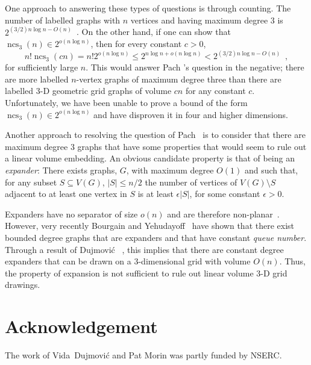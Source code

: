 \documentclass{patmorin}
\DeclareMathOperator{\ncs}{ncs}
\begin{document}
One approach to answering these types of questions is
through counting.  The number of labelled graphs with $n$
vertices and having maximum degree $3$ is $2^{(3/2)n\log n -
O(n)}$~\cite[Appendix~A]{barat.matousek.ea:bounded-degree}. On the other
hand, if one can show that $\ncs_3(n)\in 2^{o(n\log n)}$, then for every
constant $c>0$,
\[
   n!\ncs_3(cn) = n!2^{o(n\log n)} \le 2^{n\log n + o(n\log n)}
   < 2^{(3/2)n\log n - O(n)} \enspace ,
\]
for sufficiently large $n$. This would answer Pach \etal's question in
the negative; there are more labelled $n$-vertex graphs of maximum degree
three than there are labelled 3-D geometric grid graphs of volume $cn$
for any constant $c$.  Unfortunately, we have been unable to prove a
bound of the form $\ncs_3(n)\in 2^{o(n\log n)}$ and have disproven it
in four and higher dimensions.

Another approach to resolving the question of Pach \etal\ is to consider
that there are maximum degree 3 graphs that have some properties that
would seem to rule out a linear volume embedding.  An obvious candidate
property is that of being an \emph{expander}: There exists graphs, $G$,
with maximum degree $O(1)$ and such that, for any subset $S\subseteq
V(G)$, $|S|\le n/2$ the number of vertices of $V(G)\setminus S$ adjacent
to at least one vertex in $S$ is at least $\epsilon|S|$, for some constant
$\epsilon > 0$.

Expanders have no separator of size $o(n)$ and are therefore
non-planar~\cite{lipton.tarjan:separator}.  However, very recently
Bourgain and Yehudayoff~\cite{bourgain.yehudayoff:monotone} have
shown that there exist bounded degree graphs that are expanders and
that have constant \emph{queue number}. Through a result of Dujmovi\'c
\etal~\cite[Theorem~8]{dujmovic.por.ea:track}, this implies that there
are constant degree expanders that can be drawn on a 3-dimensional grid
with volume $O(n)$. Thus, the property of expansion is not sufficient
to rule out linear volume 3-D grid drawings.


\section*{Acknowledgement}

The work of Vida~Dujmovi\'c and Pat Morin was partly funded by NSERC.



\end{document}
